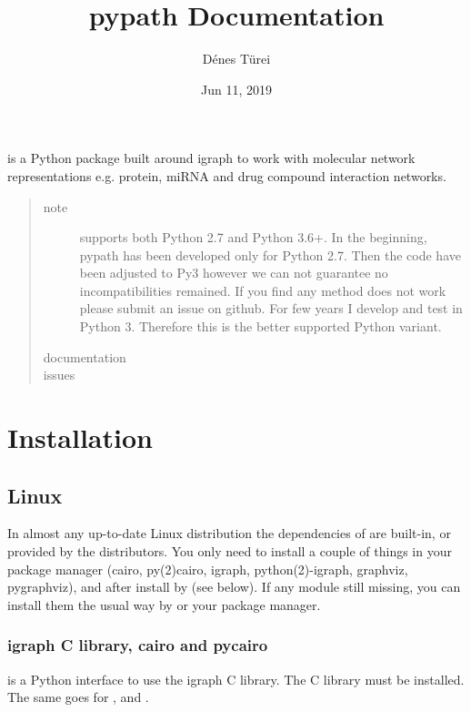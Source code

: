 \documentclass[letterpaper,10pt,english]{sphinxmanual}
\title{pypath Documentation}
\date{Jun 11, 2019}
\author{Dénes Türei}
\begin{document}
\pagestyle{empty}
\sphinxmaketitle
\pagestyle{plain}
\sphinxtableofcontents
\pagestyle{normal}
\label{\detokenize{index::doc}}


 is a Python package built around igraph to work with molecular
network representations e.g. protein, miRNA and drug compound interaction
networks.
\begin{quote}\begin{description}
\item[{note}] \leavevmode
{} supports both Python 2.7 and Python 3.6+. In the beginning,
pypath has been developed only for Python 2.7. Then the code have been
adjusted to Py3 however we can not guarantee no incompatibilities
remained. If you find any method does not work please submit an issue on
github. For few years I develop and test  in Python 3. Therefore
this is the better supported Python variant.

\item[{documentation}] \leavevmode
{}

\item[{issues}] \leavevmode
{}

\end{description}\end{quote}


\chapter{Installation}
\label{\detokenize{installation:installation}}\label{\detokenize{installation::doc}}

\section{Linux}
\label{\detokenize{installation:linux}}
In almost any up-to-date Linux distribution the dependencies of  are
built-in, or provided by the distributors. You only need to install a couple
of things in your package manager (cairo, py(2)cairo, igraph,
python(2)-igraph, graphviz, pygraphviz), and after install  by 
(see below). If any module still missing, you can install them the usual way
by  or your package manager.


\subsection{igraph C library, cairo and pycairo}
\label{\detokenize{installation:igraph-c-library-cairo-and-pycairo}}
 is a Python interface to use the igraph C library. The
C library must be installed. The same goes for ,  and
.
\end{document}
